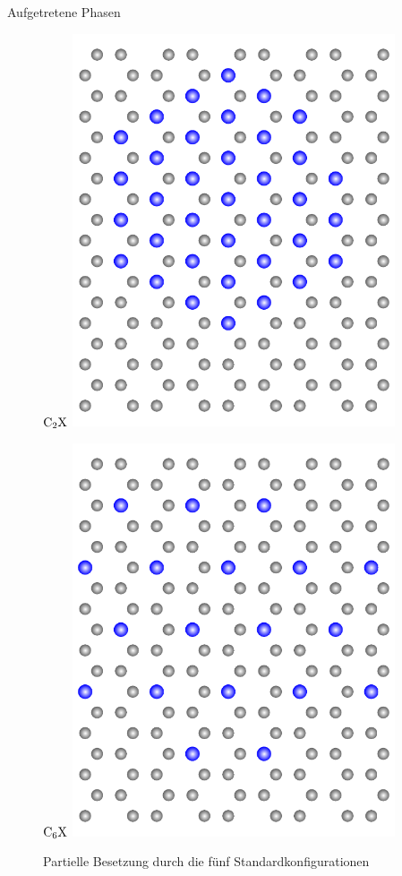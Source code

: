 \documentclass{beamer}
\begin{document}
\begin{frame}{Aufgetretene Phasen}
\begin{figure}
			\begin{minipage}[t]{0.32\textwidth}
				\centering
				$\rm C_2X$
				\includegraphics[width=0.85\textwidth, angle=90]{Abbildungen/C2X.pdf}
			\end{minipage}
			\hfill
			\begin{minipage}[t]{0.32\textwidth}
				\centering
				$\rm C_6X$
				\includegraphics[width=0.85\textwidth, angle=90]{Abbildungen/C6X.pdf}
			\end{minipage}
			\hfill
			\parbox[t]{0.25\textwidth}{
				\caption{Partielle Besetzung durch die fünf Standardkonfigurationen}
				}
		\end{figure}
	\end{frame}
	
\end{document}
